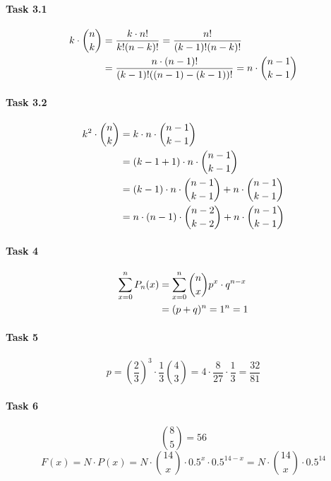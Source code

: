 \documentclass{scrreprt}
\begin{document}
\paragraph*{Task 3.1}
\begin{align}
k \cdot \binom{n}{k} &= \frac{k \cdot n!}{k!(n-k)!} = \frac{n!}{(k-1)!(n-k)!} \notag \\ 
&= \frac{n \cdot (n-1)!}{(k-1)!((n-1)-(k-1))!} = n \cdot \binom{n-1}{k-1}
\end{align}

\paragraph*{Task 3.2}
\begin{align}
k^2 \cdot \binom{n}{k} &= k \cdot n \cdot \binom{n-1}{k-1} \notag \\
&= (k-1+1) \cdot n \cdot \binom{n-1}{k-1} \notag\\
&= (k-1) \cdot n \cdot \binom{n-1}{k-1} + n \cdot \binom{n-1}{k-1} \notag\\
&= n \cdot (n-1) \cdot \binom{n-2}{k-2} + n \cdot \binom{n-1}{k-1}
\end{align}

\paragraph*{Task 4}
\begin{align}
\sum\limits_{x=0}^{n} P_n(x) &= \sum\limits_{x=0}^{n} \binom{n}{x} p^x \cdot q^{n-x} \notag\\
&=(p+q)^n = 1^n = 1
\end{align}

\paragraph*{Task 5}
\begin{equation}
p = (\frac{2}{3})^{3} \cdot \frac{1}{3} \binom{4}{3} = 4 \cdot \frac{8}{27} \cdot \frac{1}{3} = \frac{32}{81}
\end{equation}

\paragraph*{Task 6}
\begin{equation}
\binom{8}{5} = 56
\end{equation}
\begin{equation}
F(x) = N \cdot P(x) = N \cdot \binom{14}{x} \cdot 0.5^x \cdot 0.5^{14-x} = N \cdot \binom{14}{x}\cdot 0.5^{14}
\end{equation}
\end{document}
